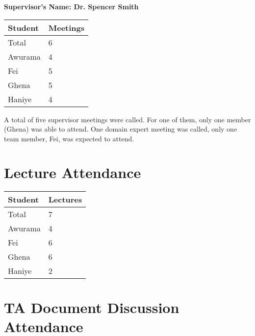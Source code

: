 \documentclass{article}
\begin{document}
\noindent \textbf{Supervisor's Name: Dr. Spencer Smith}

\begin{table}[H]
\centering
\begin{tabular}{ll}
\toprule
\textbf{Student} & \textbf{Meetings}\\
\midrule
Total & 6\\
Awurama & 4\\
Fei & 5\\
Ghena & 5\\
Haniye & 4\\
\bottomrule
\end{tabular}
\end{table}

A total of five supervisor meetings were called. For one of them, only one member (Ghena) was able to attend.
One domain expert meeting was called, only one team member, Fei, was expected to attend.
\section{Lecture Attendance}



\begin{table}[H]
\centering
\begin{tabular}{ll}
\toprule
\textbf{Student} & \textbf{Lectures}\\
\midrule
Total & 7\\
Awurama & 4\\
Fei & 6\\
Ghena & 6\\
Haniye & 2\\
\bottomrule
\end{tabular}
\end{table}

\section{TA Document Discussion Attendance}
\end{document}
